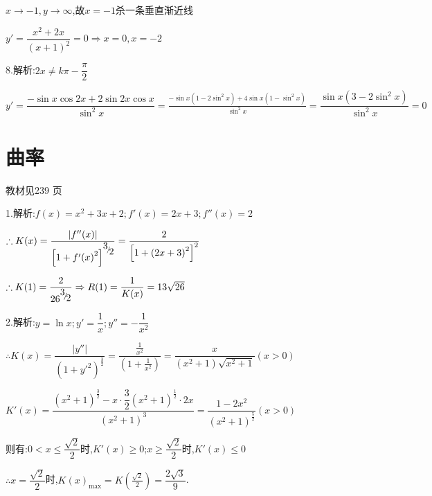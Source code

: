 $x \to  - 1,y \to \infty $,故$x = - 1$杀一条垂直渐近线

${y' } = \dfrac{{{x^2} + 2x}}{{{{\left( {x + 1} \right)}^2}}} = 0 \Rightarrow x = 0,x =  - 2$

8.解析:$2x \ne k\pi  - \dfrac{\pi }{2}$

$y' = \dfrac{{ - \sin x\cos 2x + 2\sin 2x\cos x}}{{{{\sin }^2}x}} = \frac{{ - \sin x\left( {1 - 2{{\sin }^2}x} \right) + 4\sin x\left( {1 - {{\sin }^2}x} \right)}}{{{{\sin }^2}x}} = \dfrac{{\sin x\left( {3 - 2{{\sin }^2}x} \right)}}{{{{\sin }^2}x}} = 0$










\section{曲率}
\begin{flushright}
  \color{zhanqing!80}
   教材见239 页 %
\end{flushright}

1.解析:$f(x) = {x^2} + 3x + 2;f'(x) = 2x + 3;f''(x) = 2$

$\therefore K(x) = \dfrac{{|f''(x)|}}{{{{\left[ {1 + f'{{(x)}^2}} \right]}^{{\raise0.7ex\hbox{$3$} \!\mathord{\left/
 {\vphantom {3 2}}\right.\kern-\nulldelimiterspace}
\!\lower0.7ex\hbox{$2$}}}}}} = \dfrac{2}{{{{\left[ {1 + {{(2x + 3)}^2}} \right]}^2}}}$

$\therefore K(1) = \dfrac{2}{{{{26}^{{\raise0.7ex\hbox{$3$} \!\mathord{\left/
 {\vphantom {3 2}}\right.\kern-\nulldelimiterspace}
\!\lower0.7ex\hbox{$2$}}}}}} \Rightarrow R(1) = \dfrac{1}{{K(x)}} = 13\sqrt {26} $

2.解析:$y = \ln x;y' = \dfrac{1}{x};y'' =  - \dfrac{1}{{{x^2}}}$

$\therefore K(x) = \dfrac{{|y''|}}{{{{(1 + {{y'}^2})}^{\frac{3}{2}}}}} = \dfrac{{\frac{1}{{{x^2}}}}}{{(1 + \frac{1}{{{x^2}}})}} = \dfrac{x}{{({x^2} + 1)\sqrt {{x^2} + 1} }}(x > 0)$

$K'(x) = \dfrac{{{{({x^2} + 1)}^{\frac{3}{2}}} - x \cdot \dfrac{3}{2}{{({x^2} + 1)}^{\frac{1}{2}}} \cdot 2x}}{{{{({x^2} + 1)}^3}}} = \dfrac{{1 - 2{x^2}}}{{{{({x^2} + 1)}^{\frac{5}{2}}}}}(x > 0)$

则有:$0 < x \le \dfrac{{\sqrt 2 }}{2}$时,$K'(x) \ge 0$;$x \ge \dfrac{{\sqrt 2 }}{2}$时,$K'(x) \le 0$

$\therefore x = \dfrac{{\sqrt 2 }}{2}$时,$K{(x)_{\max }} = K(\frac{{\sqrt 2 }}{2}) = \dfrac{{2\sqrt 3 }}{9}$.

